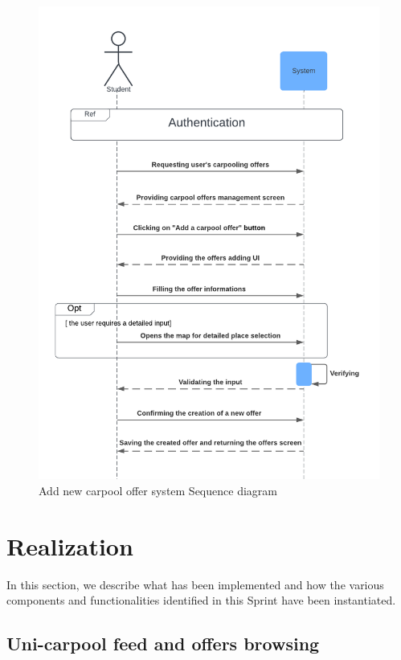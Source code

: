 \begin{figure}[H] 
            \centering
            \includegraphics[scale=0.5]{diagrams/Sequence diagram system add carpool offer.png}
            \caption{Add new carpool offer system Sequence diagram } 
            \label{fig: Add new carpool offer system Sequence diagram}
\end{figure}

\section{Realization}
In this section, we describe what has been implemented and how the various components and functionalities identified in this Sprint have been instantiated.

\subsection{Uni-carpool feed and offers browsing}

